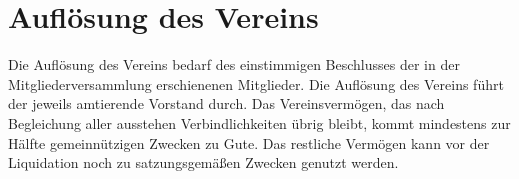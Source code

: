 \section{Auflösung des Vereins}	\label{11}
Die Auflösung des Vereins bedarf des einstimmigen Beschlusses der in der Mitgliederversammlung erschienenen Mitglieder.
Die Auflösung des Vereins führt der jeweils amtierende Vorstand durch. Das Vereinsvermögen, das nach Begleichung aller ausstehen Verbindlichkeiten übrig bleibt, kommt mindestens zur Hälfte gemeinnützigen Zwecken zu Gute. Das restliche Vermögen kann vor der Liquidation noch zu satzungsgemäßen Zwecken genutzt werden.
















